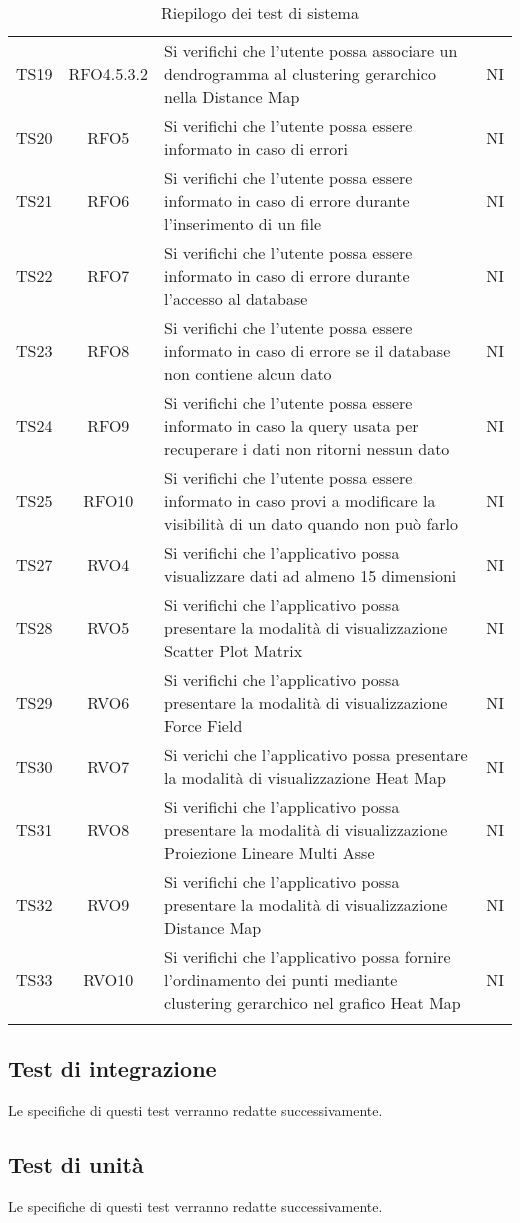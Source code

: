 \documentclass[../piano_di_qualifica.tex]{subfiles}
\begin{document}
\begin{center}
\begin{longtable}{|c|c|p{8cm}|c|}
		TS19 & RFO4.5.3.2   & Si verifichi che l'utente possa associare un dendrogramma al clustering gerarchico nella Distance Map & NI \\
		TS20 & RFO5     & Si verifichi che l'utente possa essere informato in caso di errori & NI \\
		TS21 & RFO6     & Si verifichi che l'utente possa essere informato in caso di errore durante l'inserimento di un file & NI \\
		TS22 & RFO7     & Si verifichi che l'utente possa essere informato in caso di errore durante l'accesso al database & NI \\
		TS23 & RFO8    & Si verifichi che l'utente possa essere informato in caso di errore se il database non contiene alcun dato & NI \\
		TS24 & RFO9   & Si verifichi che l'utente possa essere informato in caso la query usata per recuperare i dati non ritorni nessun dato & NI \\
		TS25 & RFO10   & Si verifichi che l'utente possa essere informato in caso provi a modificare la visibilità di un dato quando non può farlo & NI \\
		TS27 &  RVO4    & Si verifichi che l'applicativo possa visualizzare dati ad almeno 15 dimensioni & NI \\
		TS28 & RVO5    & Si verifichi che l'applicativo possa presentare la modalità di visualizzazione Scatter Plot Matrix & NI \\
		TS29 & RVO6        & Si verifichi che l'applicativo possa presentare la modalità di visualizzazione Force Field & NI \\
		TS30 & RVO7        & Si verichi che l'applicativo possa presentare la modalità di visualizzazione Heat Map & NI \\
		TS31 & RVO8      & Si verifichi che l'applicativo possa presentare la modalità di visualizzazione Proiezione Lineare Multi Asse & NI \\
		TS32 & RVO9        & Si verifichi che l'applicativo possa presentare la modalità di visualizzazione Distance Map & NI \\
		TS33 & RVO10      & Si verifichi che l'applicativo possa fornire l'ordinamento dei punti mediante clustering gerarchico nel grafico Heat Map & NI \\
		\hline
		\rowcolor{white}
		\caption{Riepilogo dei test di sistema}
	\end{longtable}

\end{center}

\subsection{Test di integrazione}%
\label{sub:test_int}
Le specifiche di questi test verranno redatte successivamente.

\subsection{Test di unità}%
\label{sub:test_unit}
Le specifiche di questi test verranno redatte successivamente.
\end{document}
